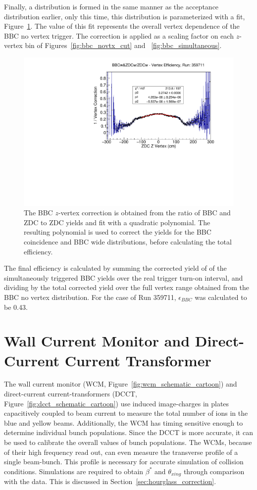 Finally, a distribution is formed in the same manner as the acceptance
distribution earlier, only this time, this distribution is parameterized with a
fit, Figure~\ref{fig:vertex_correction}. The value of this fit represents the
overall vertex dependence of the BBC no vertex trigger. The correction is
applied as a scaling factor on each $z$-vertex bin of
Figures~\ref{fig:bbc_novtx_cut} and ~\ref{fig:bbc_simultaneous}.

\begin{figure}[ht]
  \centering
  \includegraphics[width=0.8\linewidth]{./figures/vertex_correction.pdf}
  \caption{
    The BBC $z$-vertex correction is obtained from the ratio of BBC and ZDC to
    ZDC yields and fit with a quadratic polynomial. The resulting polynomial is
    used to correct the yields for the BBC coincidence and BBC wide
    distributions, before calculating the total efficiency.
  }
  \label{fig:vertex_correction}
\end{figure}

The final efficiency is calculated by summing the corrected yield of of the
simultaneously triggered BBC yields over the real trigger turn-on interval, and
dividing by the total corrected yield over the full vertex range obtained from
the BBC no vertex distribution. For the case of Run 359711, $\epsilon_{BBC}$ was
calculated to be 0.43.

\clearpage
\section{Wall Current Monitor and Direct-Current Current Transformer}

The wall current monitor (WCM, Figure~\ref{fig:wcm_schematic_cartoon}) and
direct-current current-transformers (DCCT,
Figure~\ref{fig:dcct_schematic_cartoon}) use induced image-charges in plates
capacitively coupled to beam current to measure the total number of ions in the
blue and yellow beams. Additionally, the WCM has timing sensitive enough to
determine individual bunch populations. Since the DCCT is more accurate, it can
be used to calibrate the overall values of bunch populations. The WCMs, because
of their high frequency read out, can even measure the transverse profile of a
single beam-bunch. This profile is necessary for accurate simulation of
collision conditions. Simulations are required to obtain $\beta^*$ and
$\theta_{xing}$ through comparison with the data. This is discussed in
Section~\ref{sec:hourglass_correction}.

